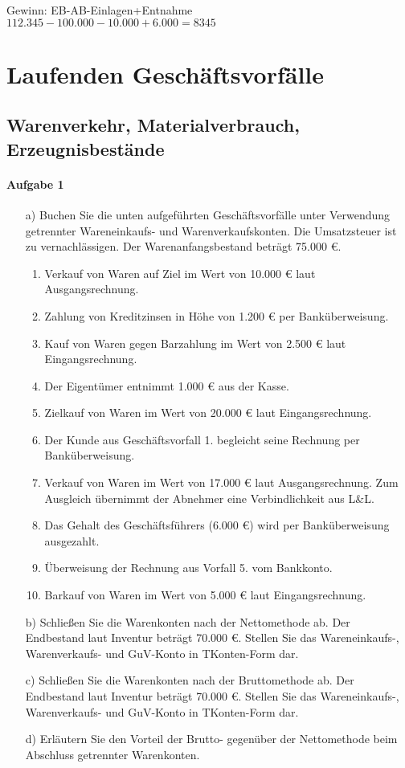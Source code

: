\documentclass[paper=a4, fontsize=11pt]{scrartcl}
\numberwithin{equation}{section}
\numberwithin{figure}{section}
\numberwithin{table}{section}
\begin{document}
Gewinn: EB-AB-Einlagen+Entnahme \\
$112.345-100.000-10.000+6.000 = 8345$
\section{Laufenden Geschäftsvorfälle}
\subsection{Warenverkehr, Materialverbrauch, Erzeugnisbestände}
\paragraph{Aufgabe 1}
\begin{itemize}
\item[a)] Buchen Sie die unten aufgeführten Geschäftsvorfälle unter Verwendung getrennter Wareneinkaufs- und Warenverkaufskonten. Die Umsatzsteuer ist zu vernachlässigen. Der Warenanfangsbestand beträgt 75.000 €. \\
 \begin{enumerate}
 \item Verkauf von Waren auf Ziel im Wert von 10.000 € laut Ausgangsrechnung.  
 \item Zahlung von Kreditzinsen in Höhe von 1.200 € per Banküberweisung.  
 \item Kauf von Waren gegen Barzahlung im Wert von 2.500 € laut Eingangsrechnung.  
 \item Der Eigentümer entnimmt 1.000 € aus der Kasse.  
 \item Zielkauf von Waren im Wert von 20.000 € laut Eingangsrechnung.  
 \item Der Kunde aus Geschäftsvorfall 1. begleicht seine Rechnung per Banküberweisung.  
 \item Verkauf von Waren im Wert von 17.000 € laut Ausgangsrechnung. Zum Ausgleich übernimmt der Abnehmer eine Verbindlichkeit aus L\&L.  
 \item Das Gehalt des Geschäftsführers (6.000 €) wird per Banküberweisung ausgezahlt.  
 \item Überweisung der Rechnung aus Vorfall 5. vom Bankkonto.  
 \item Barkauf von Waren im Wert von 5.000 € laut Eingangsrechnung.
 \end{enumerate}
\item[b)] Schließen Sie die Warenkonten nach der Nettomethode ab. Der Endbestand laut Inventur beträgt 70.000 €. Stellen Sie das Wareneinkaufs-, Warenverkaufs- und GuV-Konto in TKonten-Form dar. 
\item[c)] Schließen Sie die Warenkonten nach der Bruttomethode ab. Der Endbestand laut Inventur beträgt 70.000 €. Stellen Sie das Wareneinkaufs-, Warenverkaufs- und GuV-Konto in TKonten-Form dar. 
\item[d)] Erläutern Sie den Vorteil der Brutto- gegenüber der Nettomethode beim Abschluss getrennter Warenkonten.
\end{itemize}
\end{document}
